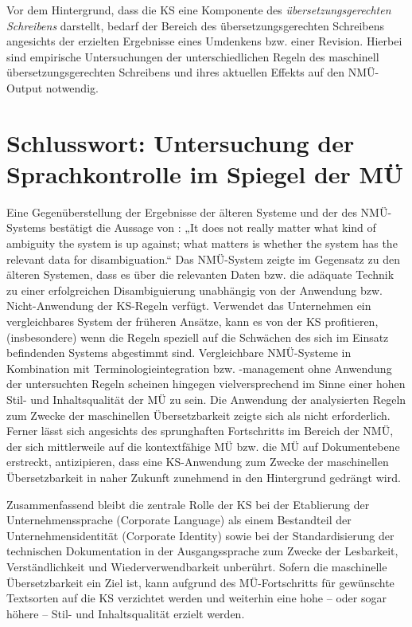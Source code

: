 Vor dem Hintergrund, dass die KS eine Komponente des \textit{übersetzungsgerechten Schreibens} darstellt, bedarf der Bereich des übersetzungsgerechten Schreibens angesichts der erzielten Ergebnisse eines Umdenkens bzw. einer Revision. Hierbei sind empirische Untersuchungen der unterschiedlichen Regeln des maschinell übersetzungsgerechten Schreibens und ihres aktuellen Effekts auf den NMÜ-Output notwendig.

\section{\label{sec:7.4}Schlusswort: Untersuchung der Sprachkontrolle im Spiegel der MÜ}

Eine Gegenüberstellung der Ergebnisse der älteren Systeme und der des NMÜ-Systems bestätigt die Aussage von \citet[94]{HutchinsSomers1992}: „It does not really matter what kind of ambiguity the system is up against; what matters is whether the system has the relevant data for disambiguation.“ Das NMÜ-System zeigte im Gegensatz zu den älteren Systemen, dass es über die relevanten Daten bzw. die adäquate Technik zu einer erfolgreichen Disambiguierung unabhängig von der Anwendung bzw. Nicht-Anwendung der KS-Regeln verfügt. Verwendet das Unternehmen ein vergleichbares System der früheren Ansätze, kann es von der KS profitieren, (insbesondere) wenn die Regeln speziell auf die Schwächen des sich im Einsatz befindenden Systems abgestimmt sind. Vergleichbare NMÜ-Systeme in Kombination mit Terminologieintegration bzw. -management ohne Anwendung der untersuchten Regeln scheinen hingegen vielversprechend im Sinne einer hohen Stil- und Inhaltsqualität der MÜ zu sein. Die Anwendung der analysierten Regeln zum Zwecke der maschinellen Übersetzbarkeit zeigte sich als nicht erforderlich. Ferner lässt sich angesichts des sprunghaften Fortschritts im Bereich der NMÜ, der sich mittlerweile auf die kontextfähige MÜ bzw. die MÜ auf Dokumentebene erstreckt, antizipieren, dass eine KS-Anwendung zum Zwecke der maschinellen Übersetzbarkeit in naher Zukunft zunehmend in den Hintergrund gedrängt wird.

Zusammenfassend bleibt die zentrale Rolle der KS bei der Etablierung der Unternehmenssprache (Corporate Language) als einem Bestandteil der Unternehmensidentität (Corporate Identity) sowie bei der Standardisierung der technischen Dokumentation in der Ausgangssprache zum Zwecke der Lesbarkeit, Verständlichkeit und Wiederverwendbarkeit unberührt. Sofern die maschinelle Übersetzbarkeit ein Ziel ist, kann aufgrund des MÜ-Fortschritts für gewünschte Textsorten auf die KS verzichtet werden und weiterhin eine hohe -- oder sogar höhere -- Stil- und Inhaltsqualität erzielt werden.
